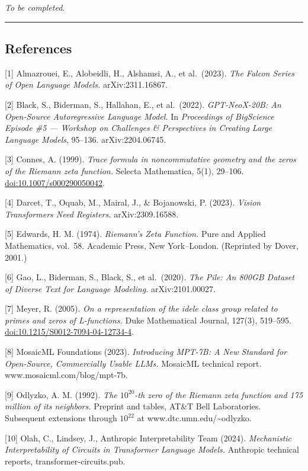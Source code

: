 \documentclass[
  letterpaper,
  11pt]{article}
\theoremstyle{plain}
\theoremstyle{definition}
\theoremstyle{remark}
\begin{document}
\emph{To be completed.}

\begin{center}\rule{0.5\linewidth}{0.5pt}\end{center}

\subsection{References}\label{references}

{[}1{]} Almazrouei, E., Alobeidli, H., Alshamsi, A., et al.~(2023). \emph{The Falcon Series of Open Language Models.} arXiv:2311.16867.

{[}2{]} Black, S., Biderman, S., Hallahan, E., et al.~(2022). \emph{GPT-NeoX-20B: An Open-Source Autoregressive Language Model.} In \emph{Proceedings of BigScience Episode \#5 --- Workshop on Challenges \& Perspectives in Creating Large Language Models}, 95--136. arXiv:2204.06745.

{[}3{]} Connes, A. (1999). \emph{Trace formula in noncommutative geometry and the zeros of the Riemann zeta function.} Selecta Mathematica, 5(1), 29--106. \url{doi:10.1007/s000290050042}.

{[}4{]} Darcet, T., Oquab, M., Mairal, J., \& Bojanowski, P. (2023). \emph{Vision Transformers Need Registers.} arXiv:2309.16588.

{[}5{]} Edwards, H. M. (1974). \emph{Riemann's Zeta Function.} Pure and Applied Mathematics, vol.~58. Academic Press, New York--London. (Reprinted by Dover, 2001.)

{[}6{]} Gao, L., Biderman, S., Black, S., et al.~(2020). \emph{The Pile: An 800GB Dataset of Diverse Text for Language Modeling.} arXiv:2101.00027.

{[}7{]} Meyer, R. (2005). \emph{On a representation of the idele class group related to primes and zeros of L-functions.} Duke Mathematical Journal, 127(3), 519--595. \url{doi:10.1215/S0012-7094-04-12734-4}.

{[}8{]} MosaicML Foundations (2023). \emph{Introducing MPT-7B: A New Standard for Open-Source, Commercially Usable LLMs.} MosaicML technical report. www.mosaicml.com/blog/mpt-7b.

{[}9{]} Odlyzko, A. M. (1992). \emph{The \(10^{20}\)-th zero of the Riemann zeta function and 175 million of its neighbors.} Preprint and tables, AT\&T Bell Laboratories. Subsequent extensions through \(10^{22}\) at www.dtc.umn.edu/\textasciitilde odlyzko.

{[}10{]} Olah, C., Lindsey, J., Anthropic Interpretability Team (2024). \emph{Mechanistic Interpretability of Circuits in Transformer Language Models.} Anthropic technical reports, transformer-circuits.pub.
\end{document}

